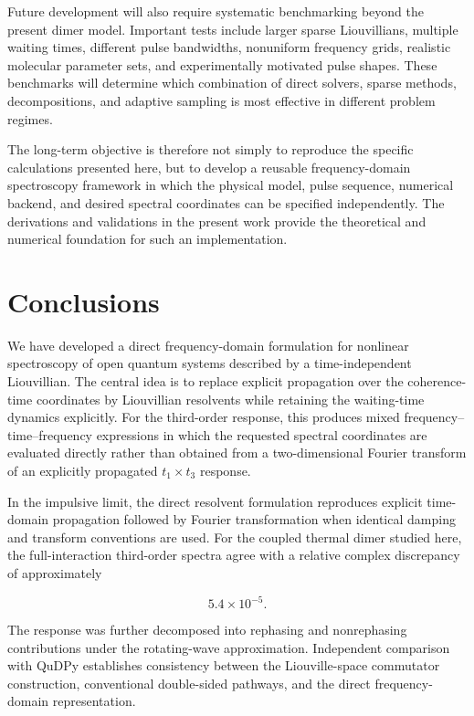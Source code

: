 \documentclass[11pt]{article}
\begin{document}
Future development will also require systematic benchmarking beyond
the present dimer model.  Important tests include larger sparse
Liouvillians, multiple waiting times, different pulse bandwidths,
nonuniform frequency grids, realistic molecular parameter sets, and
experimentally motivated pulse shapes.  These benchmarks will
determine which combination of direct solvers, sparse methods,
decompositions, and adaptive sampling is most effective in different
problem regimes.

The long-term objective is therefore not simply to reproduce the
specific calculations presented here, but to develop a reusable
frequency-domain spectroscopy framework in which the physical model,
pulse sequence, numerical backend, and desired spectral coordinates
can be specified independently.  The derivations and validations in
the present work provide the theoretical and numerical foundation for
such an implementation.

\section{Conclusions}
\label{sec:conclusions}

We have developed a direct frequency-domain formulation for nonlinear
spectroscopy of open quantum systems described by a time-independent
Liouvillian. The central idea is to replace explicit propagation over
the coherence-time coordinates by Liouvillian resolvents while
retaining the waiting-time dynamics explicitly. For the third-order
response, this produces mixed frequency--time--frequency expressions in
which the requested spectral coordinates are evaluated directly rather
than obtained from a two-dimensional Fourier transform of an explicitly
propagated $t_1\times t_3$ response.

In the impulsive limit, the direct resolvent formulation reproduces
explicit time-domain propagation followed by Fourier transformation
when identical damping and transform conventions are used. For the
coupled thermal dimer studied here, the full-interaction third-order
spectra agree with a relative complex discrepancy of approximately

\begin{equation}
5.4\times10^{-5}.
\end{equation}

The response was further decomposed into rephasing and nonrephasing
contributions under the rotating-wave approximation. Independent
comparison with QuDPy establishes consistency between the
Liouville-space commutator construction, conventional double-sided
pathways, and the direct frequency-domain representation.
\end{document}
